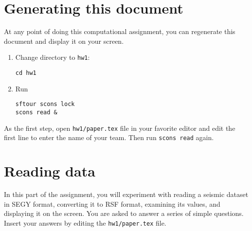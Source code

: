 \section{Generating this document}

At any point of doing this computational assignment, you can
regenerate this document and display it on your screen.

\begin{enumerate}          
\item Change directory to \texttt{hw1}:
\begin{verbatim}
cd hw1
\end{verbatim}
\item Run
\begin{verbatim}
sftour scons lock
scons read &
\end{verbatim}
\end{enumerate}

As the first step, open \texttt{hw1/paper.tex} file in your favorite
editor and edit the first line to enter the name of your team. Then
run \texttt{scons read} again.

\section{Reading data}

In this part of the assignment, you will experiment with reading a
seismic dataset in SEGY format, converting it to RSF format, examining
its values, and displaying it on the screen. You are asked to answer a
series of simple questions. Insert your answers by editing
the \texttt{hw1/paper.tex} file.

